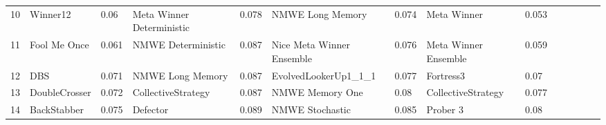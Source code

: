 \begin{tabular}{lggllggllggllr}
    10 &                 Winner12 &      0.06 &  Meta Winner Deterministic &     0.078 &           NMWE Long Memory &     0.074 &                Meta Winner &     0.053 \\
    11 &             Fool Me Once &     0.061 &         NMWE Deterministic &     0.087 &  Nice Meta Winner Ensemble &     0.076 &       Meta Winner Ensemble &     0.059 \\
    12 &                      DBS &     0.071 &           NMWE Long Memory &     0.087 &       EvolvedLookerUp1\_1\_1 &     0.077 &                  Fortress3 &      0.07 \\
    13 &            DoubleCrosser &     0.072 &         CollectiveStrategy &     0.087 &            NMWE Memory One &      0.08 &         CollectiveStrategy &     0.077 \\
    14 &              BackStabber &     0.075 &                   Defector &     0.089 &            NMWE Stochastic &     0.085 &                   Prober 3 &      0.08 \\
    \bottomrule
    \end{tabular}
    